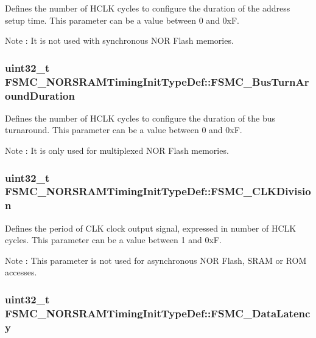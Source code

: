\label{structFSMC__NORSRAMTimingInitTypeDef_a2ba90f4ec16bc38a2c4fa29c593b713b}
Defines the number of HCLK cycles to configure the duration of the address setup time. This parameter can be a value between 0 and 0xF. \begin{DoxyNote}{Note}
: It is not used with synchronous NOR Flash memories. 
\end{DoxyNote}
\hypertarget{structFSMC__NORSRAMTimingInitTypeDef_a3d98d57618e46ec6aa5d876dcc047d32}{
\subsubsection[{FSMC\_\-BusTurnAroundDuration}]{\setlength{\rightskip}{0pt plus 5cm}uint32\_\-t {\bf FSMC\_\-NORSRAMTimingInitTypeDef::FSMC\_\-BusTurnAroundDuration}}}
\label{structFSMC__NORSRAMTimingInitTypeDef_a3d98d57618e46ec6aa5d876dcc047d32}
Defines the number of HCLK cycles to configure the duration of the bus turnaround. This parameter can be a value between 0 and 0xF. \begin{DoxyNote}{Note}
: It is only used for multiplexed NOR Flash memories. 
\end{DoxyNote}
\hypertarget{structFSMC__NORSRAMTimingInitTypeDef_a251b439331b82eecea58aa3f8882ea15}{
\subsubsection[{FSMC\_\-CLKDivision}]{\setlength{\rightskip}{0pt plus 5cm}uint32\_\-t {\bf FSMC\_\-NORSRAMTimingInitTypeDef::FSMC\_\-CLKDivision}}}
\label{structFSMC__NORSRAMTimingInitTypeDef_a251b439331b82eecea58aa3f8882ea15}
Defines the period of CLK clock output signal, expressed in number of HCLK cycles. This parameter can be a value between 1 and 0xF. \begin{DoxyNote}{Note}
: This parameter is not used for asynchronous NOR Flash, SRAM or ROM accesses. 
\end{DoxyNote}
\hypertarget{structFSMC__NORSRAMTimingInitTypeDef_abc33886615fc3627448aa2dba11cfc77}{
\subsubsection[{FSMC\_\-DataLatency}]{\setlength{\rightskip}{0pt plus 5cm}uint32\_\-t {\bf FSMC\_\-NORSRAMTimingInitTypeDef::FSMC\_\-DataLatency}}}
